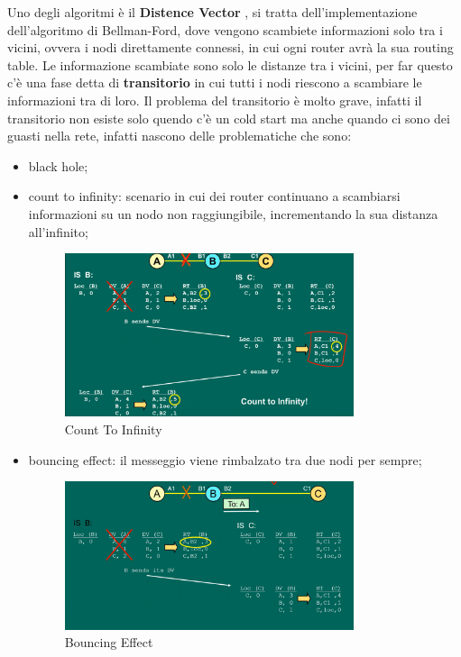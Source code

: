\documentclass[12pt]{article}
\begin{document}
Uno degli algoritmi \`e il \textbf{Distence Vector} , si tratta dell'implementazione dell'algoritmo di Bellman-Ford, dove vengono scambiete informazioni solo tra i vicini, ovvera i nodi direttamente connessi, in cui ogni router avr\`a la sua routing table. Le informazione scambiate sono solo le distanze tra i vicini, per far questo c'\`e una fase detta di \textbf{transitorio} in cui tutti i nodi riescono a scambiare le informazioni tra di loro. Il problema del transitorio \`e molto grave, infatti il transitorio non esiste solo quendo c'\`e un cold start ma anche quando ci sono dei guasti nella rete, infatti nascono delle problematiche che sono:
\begin{itemize}
    \item black hole;
    \item count to infinity: scenario in cui dei router continuano a scambiarsi informazioni su un nodo non raggiungibile, incrementando la sua distanza all'infinito;
        \begin{figure}[H]
            \centering
            \includegraphics[width=0.8\textwidth]{count-to-infinity.png}
            \caption{Count To Infinity}
            \label{fig:count-to-infinity}
        \end{figure}
    \item bouncing effect: il messeggio viene rimbalzato tra due nodi per sempre;
        \begin{figure}[H]
            \centering
            \includegraphics[width=0.8\textwidth]{bouncing-effect.png}
            \caption{Bouncing Effect}
            \label{fig:bouncing-effect}
        \end{figure}
\end{itemize}
\end{document}
